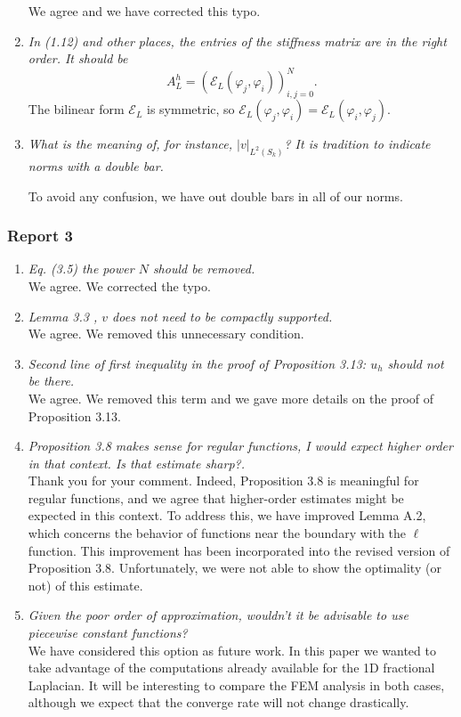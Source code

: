 \documentclass[11 pt]{article}
\numberwithin{equation}{section}
\begin{document}
\begin{enumerate}
    We agree and we have corrected this typo.

    \item \emph{In (1.12) and other places, the entries of the stiffness matrix are in the right order. It should be
    \[
    A_L^h = (\mathcal E_L(\varphi_j, \varphi_i))_{i,j=0}^{N}.
    \]}
    The bilinear form $\mathcal E_L$ is symmetric, so $\mathcal E_L(\varphi_j, \varphi_i)=\mathcal E_L(\varphi_i, \varphi_j)$.

    \item \emph{What is the meaning of, for instance, \( |v|_{L^2(S_k)} \)? It is tradition to indicate norms with a double bar.}

To avoid any confusion, we have out double bars in all of our norms.
\end{enumerate}



\subsubsection*{Report 3}

\begin{enumerate}
\item \emph{Eq. (3.5) the power $N$ should be removed.}\\
We agree. We corrected the typo.
\item \emph{Lemma 3.3 , $v$ does not need to be compactly supported.}\\
We agree. We removed this unnecessary condition.
\item \emph{Second line of first inequality in the proof of Proposition 3.13: $u_h$ should not be there.}\\
We agree. We removed this term and we gave more details on the proof of Proposition 3.13.
\item \emph{Proposition 3.8 makes sense for regular functions, I would expect higher order in that context. Is that estimate sharp?.}\\
Thank you for your comment. Indeed, Proposition 3.8 is meaningful for regular functions, and we agree that higher-order estimates might be expected in this context. To address this, we have improved Lemma A.2, which concerns the behavior of functions near the boundary with the $\ell$ function. This improvement has been incorporated into the revised version of Proposition 3.8.  Unfortunately, we were not able to show the optimality (or not) of this estimate.
\item \emph{Given the poor order of approximation, wouldn't it be advisable to use piecewise constant functions?}\\
We have considered this option as future work.  In this paper we wanted to take advantage of the computations already available for the 1D fractional Laplacian. It will be interesting to compare the FEM analysis in both cases, although we expect that the converge rate will not change drastically.
\end{enumerate}
\end{document}
